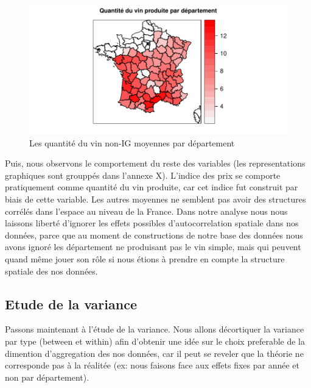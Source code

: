 \documentclass[11pt,]{article}
\begin{document}
\begin{figure}[!htbp]

{\centering \includegraphics{note2pres_files/figure-latex/unnamed-chunk-18-1} 

}

\caption{Les quantité du vin non-IG moyennes par département}\label{fig:unnamed-chunk-18}
\end{figure}

\FloatBarrier

Puis, nous observons le comportement du reste des variables (les
representations graphiques sont grouppés dans l'annexe X). L'indice des
prix se comporte pratiquement comme quantité du vin produite, car cet
indice fut construit par biais de cette variable. Les autres moyennes ne
semblent pas avoir des structures corrélés dans l'espace au niveau de la
France. Dans notre analyse nous nous laissons liberté d'ignorer les
effets possibles d'autocorrelation spatiale dans nos données, parce que
au moment de constructions de notre base des données nous avons ignoré
les département ne produisant pas le vin simple, mais qui peuvent quand
même jouer son rôle si nous étions à prendre en compte la structure
spatiale des nos données.

\hypertarget{etude-de-la-variance}{%
\subsection{Etude de la variance}\label{etude-de-la-variance}}

Passons maintenant à l'étude de la variance. Nous allons décortiquer la
variance par type (between et within) afin d'obtenir une idée sur le
choix preferable de la dimention d'aggregation des nos données, car il
peut se reveler que la théorie ne corresponde pas à la réalitée (ex:
nous faisons face aux effets fixes par année et non par département).
\end{document}
